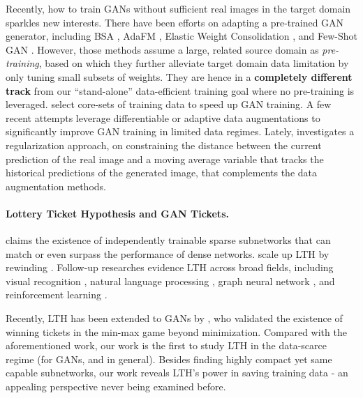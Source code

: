 \documentclass{article}
\begin{document}

Recently, how to train GANs without sufficient real images in the target domain sparkles new interests. There have been efforts on adapting a pre-trained GAN generator, including BSA \cite{noguchi2019image}, AdaFM \cite{zhao2020leveraging}, Elastic Weight Consolidation \cite{li2020few}, and Few-Shot GAN \cite{robb2020few,antoniou2017data,garcia2017few}. However, those methods assume a
large, related source domain as \textit{pre-training}, based on which they further alleviate target domain data limitation by only tuning small subsets of weights. They are hence in a \textbf{completely different track} from our ``stand-alone'' data-efficient training goal where no pre-training is leveraged. \cite{sinha2020small,devries2020instance} select core-sets of training data to speed up GAN training. A few recent attempts \cite{zhao2020diffaugment,karras2020training} leverage differentiable or adaptive data augmentations to significantly improve GAN training in limited data regimes. Lately, \cite{tseng2021regularizing} investigates a regularization approach, on constraining the distance between the current prediction of the real image and a moving average variable that tracks the historical predictions of the generated image, that complements the data augmentation methods.

\vspace{-1mm}
\paragraph{Lottery Ticket Hypothesis and GAN Tickets.} \cite{Frankle:2019vz} claims the existence of independently trainable sparse subnetworks that can match or even surpass the performance of dense networks. \cite{liu2018rethinking,gale2019state} scale up LTH by rewinding \cite{frankle2019linear,Renda2020Comparing}. Follow-up researches evidence LTH across broad fields, including visual recognition \cite{Frankle:2019vz,liu2018rethinking,grasp,evci2019difficulty,Frankle2020The,savarese2020winning,yin2020the,You2020Drawing,chen2021long,ma2021good,chen2020lottery2,pmlr-v139-zhang21c}, natural language processing \cite{gale2019state,yu2019playing,Renda2020Comparing,chen2020lottery,desai2019evaluating,chen2020earlybert}, graph neural network \cite{chen2021unified}, and reinforcement learning \cite{yu2019playing}. 

Recently, LTH has been extended to GANs by \cite{chen2021gans,Kalibhat2020WinningLT}, who validated the existence of winning tickets in the min-max game beyond minimization. Compared with the aforementioned work, our work is the first to study LTH in the data-scarce regime (for GANs, and in general). Besides finding highly compact yet same capable subnetworks, our work reveals LTH's power in saving training data - an appealing perspective never being examined before.
\end{document}
